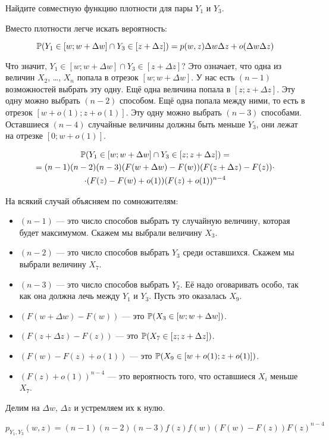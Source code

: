 \begin{myex}
Найдите совместную функцию плотности для пары  $ Y_{1} $ и $ Y_{3} $.

Вместо плотности легче искать вероятность:

\begin{equation}
 \P(Y_{1}\in [w;w+\Delta w] \cap Y_{3} \in [z+\Delta z] )=p(w,z)\Delta w\Delta z+o(\Delta w \Delta z)
\end{equation}


Что значит, $ Y_{1} \in [w;w+\Delta w] \cap Y_{3} \in [z+\Delta z]$? Это означает, что одна из величин $ X_{2} $, \ldots, $ X_{n} $ попала в отрезок $ [w;w+\Delta w] $. У нас есть $ (n-1) $ возможностей выбрать эту одну. Ещё одна величина попала в $ [z;z+\Delta z] $. Эту одну можно выбрать $ (n-2) $ способом. Ещё одна попала между ними, то есть в отрезок $ [w+o(1);z+o(1)] $. Эту одну можно выбрать $(n-3)$ способами. Оставшиеся $ (n-4) $ случайные величины должны быть меньше $ Y_{3} $, они лежат на отрезке $ [0;w+o(1)] $.

\begin{multline}
\P(Y_{1}\in [w;w+\Delta w] \cap Y_{3}\in [z;z+\Delta z] ) =\\
= (n-1)(n-2)(n-3) (F(w+\Delta w)-F(w)) (F(z+\Delta z)-F(z))\cdot \\
\cdot (F(z)-F(w)+o(1)) (F(z)+o(1))^{n-4}
\end{multline}

На всякий случай объясняем по сомножителям:
\begin{itemize}
\item $(n-1)  $ — это число способов выбрать ту случайную величину, которая будет максимумом. Скажем мы выбрали величину $ X_{3} $.
\item $ (n-2) $ — это число способов выбрать $ Y_{3} $ среди оставшихся. Скажем мы выбрали величину $ X_{7} $.
\item $ (n-3) $ — это число способов выбрать $ Y_{2} $. Её надо оговаривать особо, так как она должна лечь между $ Y_{1} $ и $ Y_{3} $. Пусть это оказалась $ X_{9} $.
\item $(F(w+\Delta w)-F(w))$ — это $ \P(X_{3}\in [w;w+\Delta w]) $.
\item $(F(z+\Delta z)-F(z))$ — это $ \P(X_{7}\in [z;z+\Delta z] ) $.
\item $(F(w)-F(z)+o(1))$ — это $ \P(X_{9}\in [w+o(1);z+o(1)] ) $.
\item $ (F(z)+o(1))^{n-4} $ — это вероятность того, что оставшиеся $ X_{i} $ меньше $ X_{7} $.
\end{itemize}

Делим на $ \Delta w $, $ \Delta z $ и устремляем их к нулю.

\begin{equation}
p_{Y_{1},Y_{3}}(w,z)=(n-1)(n-2)(n-3)f(z)f(w)(F(w)-F(z))F(z)^{n-4}
\end{equation}

\end{myex}










